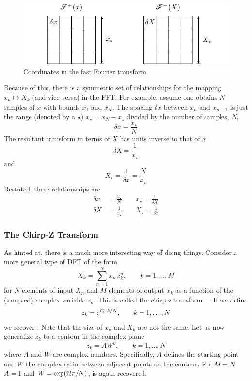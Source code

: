 \begin{figure}[ht]
\centering
\includegraphics[keepaspectratio]{speckle/figures/fftdrawing.pdf}
\caption{Coordinates in the fast Fourier transform.}
\label{fig:fftdrawing}
\end{figure}
Because of this, there is a symmetric set of relationships for the mapping
$x_n \mapsto X_k$ (and vice versa) in the FFT.  For example, assume one
obtains $N$ samples of $x$ with bounds $x_1$ and $x_N$.  The
spacing $\delta x$ between $x_n$ and $x_{n+1}$ is just the range (denoted
by a $\star$)
$x_\star = x_N-x_1$ divided by the number of samples, $N$,
\begin{equation}
\delta x = \frac{x_\star}{N}
\end{equation}
The resultant transform in terms of $X$ has units inverse to that of $x$
\begin{equation}
\delta X = \frac{1}{x_\star}
\end{equation}
and
\begin{equation}
X_\star=\frac{1}{\delta x}=\frac{N}{x_\star}
\end{equation}
Restated, these relationships are
\begin{align}
\delta x &= \frac{x_\star}{N}\qquad x_\star
=\frac{1}{\delta X} \\
\delta X &= \frac{1}{x_\star}\qquad X_\star = \frac{1}{\delta x}
\label{eqn:fftrelationships}
\end{align}

\subsubsection{The Chirp-Z Transform}
As hinted at, there is a much more interesting way of doing things.
Consider a more general type of DFT of the form
\begin{equation}
X_k = \sum_{n=1}^{N} x_n\, z_k^n, \qquad k=1,\ldots,M
\label{eqn:czt}
\end{equation}
for $N$ elements of input $X_n$ and $M$ elements of output $x_k$ as a
function of the (sampled) complex variable  $z_k$.  This is called the
chirp-z transform~\cite{rabiner1969chirp}~\cite{rabiner1969chirp2}.
If we define
\begin{equation}
z_k = {\mathrm{e}}^{{\mathrm{i}} 2\pi k/N}, \qquad k=1,\ldots,N
\end{equation}
we recover .  Note that the size of $x_n$ and $X_k$
are not the same.  Let us now generalize $z_k$ to a contour in the complex plane
\begin{equation}
z_k = A W^k, \qquad k=1,\ldots,N
\end{equation}
where $A$ and $W$ are complex numbers.  Specifically, $A$ defines the
starting point and $W$ the complex ratio between adjacent points on the
contour.  For $M=N$, $A=1$ and $W=\exp({\mathrm{i}} 2 \pi/N)$, 
is again recovered.  

